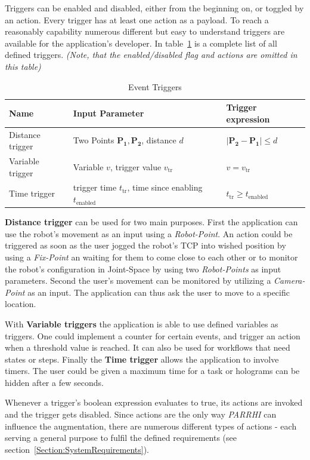 Triggers can be enabled and disabled, either from the beginning on, or toggled by an action. Every trigger has at least one action as a payload. To reach a reasonably capability numerous different but easy to understand triggers are available for the application's developer. In table~\ref{Table:Triggers} is a complete list of all defined triggers. \textit{(Note, that the enabled/disabled flag and actions are omitted in this table)}

 
 \begin{table}
 	\caption{Event Triggers}
 	\label{Table:Triggers}
 	\centering
 	\begin{tabular}{lll}
 		\toprule
 		Name & Input Parameter		& Trigger expression	\\		
 		\midrule
 		Distance trigger & Two Points $\boldsymbol{P_1}, \boldsymbol{P_2}$, distance $d$		&  $|\boldsymbol{P_2}-\boldsymbol{P_1}| \le d$ \\
		Variable trigger & Variable $v$, trigger value $v_{\text{tr}}$ 		& $v = v_{\text{tr}}$	 \\
		Time trigger & trigger time $t_{\text{tr}}$, time since enabling $t_{\text{enabled}}$ & $t_{\text{tr}} \geq t_{\text{enabled}}$\\
		\bottomrule
	\end{tabular}
\end{table}

\textbf{Distance trigger} can be used for two main purposes. First the application can use the robot's movement as an input using a \textit{Robot-Point}. An action could be triggered as soon as the user jogged the robot's TCP into wished position by using a \textit{Fix-Point} an waiting for them to come close to each other or to monitor the robot's configuration in Joint-Space by using two \textit{Robot-Points} as input parameters. Second the user's movement can be monitored by utilizing a \textit{Camera-Point} as an input. The application can thus ask the user to move to a specific location.

With \textbf{Variable triggers} the application is able to use defined variables as triggers. One could implement a counter for certain events, and trigger an action when a threshold value is reached. It can also be used for workflows that need states or steps. Finally the \textbf{Time trigger} allows the application to involve timers. The user could be given a maximum time for a task or holograms can be hidden after a few seconds.

Whenever a trigger's boolean expression evaluates to true, its actions are invoked and the trigger gets disabled. Since actions are the only way \textit{PARRHI} can influence the augmentation, there are numerous different types of actions - each serving a general purpose to fulfil the defined requirements (see section~\ref{Section:SystemRequirements}).

